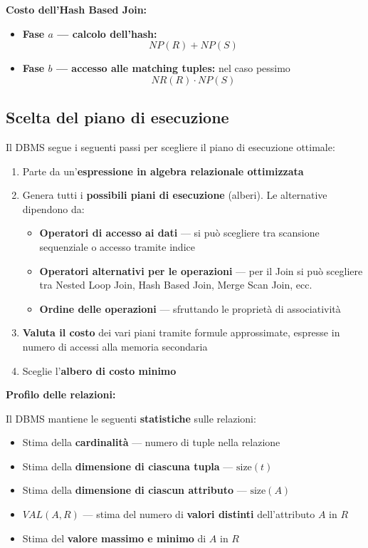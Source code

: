 \bigskip
\noindent\textbf{Costo dell'Hash Based Join:}

\begin{itemize}
	\item \textbf{Fase $a$ — calcolo dell'hash:}
	\[
	NP(R) + NP(S)
	\]
	\item \textbf{Fase $b$ — accesso alle matching tuples:} nel caso pessimo
	\[
	NR(R) \cdot NP(S)
	\]
\end{itemize}
\subsection{Scelta del piano di esecuzione}

Il DBMS segue i seguenti passi per scegliere il piano di esecuzione ottimale:

\begin{enumerate}
	\item Parte da un'\textbf{espressione in algebra relazionale ottimizzata}
	\item Genera tutti i \textbf{possibili piani di esecuzione} (alberi). Le alternative dipendono da:
	\begin{itemize}
		\item \textbf{Operatori di accesso ai dati} — si può scegliere tra scansione sequenziale o accesso tramite indice
		\item \textbf{Operatori alternativi per le operazioni} — per il Join si può scegliere tra Nested Loop Join, Hash Based Join, Merge Scan Join, ecc.
		\item \textbf{Ordine delle operazioni} — sfruttando le proprietà di associatività
	\end{itemize}
	\item \textbf{Valuta il costo} dei vari piani tramite formule approssimate, espresse in numero di accessi alla memoria secondaria
	\item Sceglie l'\textbf{albero di costo minimo}
\end{enumerate}

\bigskip
\noindent\textbf{Profilo delle relazioni:}

\noindent Il DBMS mantiene le seguenti \textbf{statistiche} sulle relazioni:

\begin{itemize}
	\item Stima della \textbf{cardinalità} — numero di tuple nella relazione
	\item Stima della \textbf{dimensione di ciascuna tupla} — $\text{size}(t)$
	\item Stima della \textbf{dimensione di ciascun attributo} — $\text{size}(A)$
	\item $VAL(A, R)$ — stima del numero di \textbf{valori distinti} dell'attributo $A$ in $R$
	\item Stima del \textbf{valore massimo e minimo} di $A$ in $R$
\end{itemize}
